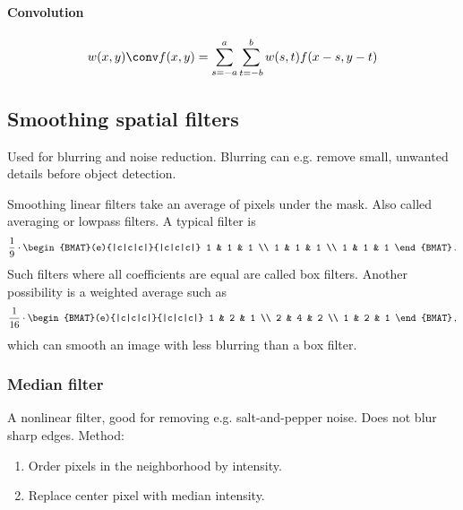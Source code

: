 \paragraph{Convolution}
\begin{equation}\label{eq:conv}
    w(x,y) \conv f(x,y)
    =
    \sum_{s=-a}^{a}
    \sum_{t=-b}^{b}
    w(s,t) f(x-s, y-t)
\end{equation}

\subsection{Smoothing spatial filters}
Used for blurring and noise reduction. Blurring can e.g. remove small, unwanted details before object detection.

Smoothing linear filters take an average of pixels under the mask. Also called averaging or lowpass filters. A typical filter is
\begin{equation}
    \frac{1}{9}
    \cdot
    \begin{BMAT}(e){|c|c|c|}{|c|c|c|}
        1 & 1 & 1 \\
        1 & 1 & 1 \\
        1 & 1 & 1
    \end{BMAT}
    \, .
\end{equation}
Such filters where all coefficients are equal are called box filters. Another possibility is a weighted average such as
\begin{equation}
    \frac{1}{16}
    \cdot
    \begin{BMAT}(e){|c|c|c|}{|c|c|c|}
        1 & 2 & 1 \\
        2 & 4 & 2 \\
        1 & 2 & 1
    \end{BMAT}
    \, ,
\end{equation}
which can smooth an image with less blurring than a box filter.

\subsubsection{Median filter}
A nonlinear filter, good for removing e.g. salt-and-pepper noise. Does not blur sharp edges. Method:
\begin{enumerate}
    \item Order pixels in the neighborhood by intensity.
    \item Replace center pixel with median intensity.
\end{enumerate}

